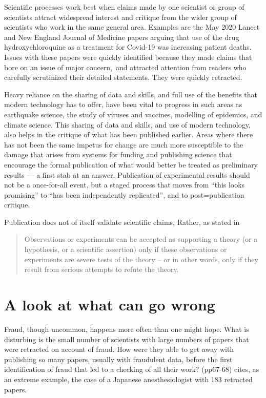 \documentclass[
  10pt,
  b5paper]{book}
\begin{document}
Scientific processes work best when claims made by one scientist
or group of scientists attract widespread interest and critique
from the wider group of scientists who work in the same general
area. Examples are the May 2020 Lancet and New England Journal of
Medicine papers arguing that use of the drug hydroxychloroquine
as a treatment for Covid-19 was increasing patient deaths.\\
Issues with these papers were quickly identified because they
made claims that bore on an issue of major concern,~and attracted
attention from readers who carefully scrutinized their detailed
statements. They were quickly retracted.

Heavy reliance on the sharing of data and skills, and full use of
the benefits that modern technology has to offer, have been vital
to progress in such areas as earthquake science, the study of
viruses and vaccines, modelling of epidemics, and climate science.
This sharing of data and skills, and use of modern technology, also
helps in the critique of what has been published earlier.
Areas where there has not been the same impetus for change are much
more susceptible to the damage that arises from systems for funding
and publishing science that encourage the formal publication of
what would better be treated as preliminary results --- a first
stab at an answer. Publication of experimental results should not
be a once-for-all event, but a staged process that moves from
``this looks promising'' to ``has been independently replicated'',
and to post=publication critique.

Publication does not of itself validate scientific claims,
Rather, as stated in \citet{popper_1963}

\begin{quote}
Observations or experiments can be accepted as supporting a theory (or a hypothesis, or a scientific assertion) only if these observations or experiments are severe tests of the theory -- or in other words, only if they result from serious attempts to refute the theory.
\end{quote}

\hypertarget{a-look-at-what-can-go-wrong}{%
\section{A look at what can go wrong}\label{a-look-at-what-can-go-wrong}}

Fraud, though uncommon, happens more often than one might hope.
What is disturbing is the small number of scientists with
large numbers of papers that were retracted on account of
fraud. How were they able to get away with publishing so
many papers, usually with fraudulent data, before the
first identification of fraud that led to a checking of all
their work? \citet{ritchie2020science} (pp67-68) cites, as an
extreme example, the case of a Japanese anesthesiologist
with 183 retracted papers.
\end{document}
